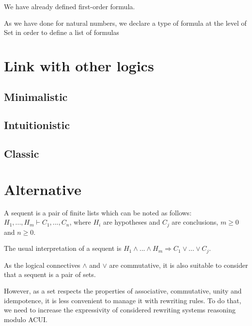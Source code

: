 \documentclass{article}
\begin{document}
		
	We have already defined first-order formula.
	
	As we have done for natural numbers, we declare a type of formula at the level of Set in order to define a list of formulas
	
	
	
	
	
	
	
	
	
	
	
	\section{Link with other logics}
	
	\subsection{Minimalistic}
	
	\subsection{Intuitionistic}
	
	\subsection{Classic}
	
	
	\section{Alternative}
	
	A sequent is a pair of finite lists which can be noted as follows: $H_1,...,H_m \vdash C_1,...,C_n$, where $H_i$ are hypotheses and $C_j$ are conclusions, $m \ge 0$ and $n \ge 0$.
	
	The usual interpretation of a sequent is
	$H_1 \land ... \land H_m \Rightarrow C_1 \lor ... \lor C_j$.
	
	As the logical connectives $\land$ and $\lor$ are commutative, it is also suitable to consider that a sequent is a pair of sets.
	
	However, as a set respects the properties of associative, commutative, unity and idempotence, it is less convenient to manage it with rewriting rules.
	To do that, we need to increase the expressivity of considered rewriting systems reasoning modulo ACUI.
	
\end{document}
